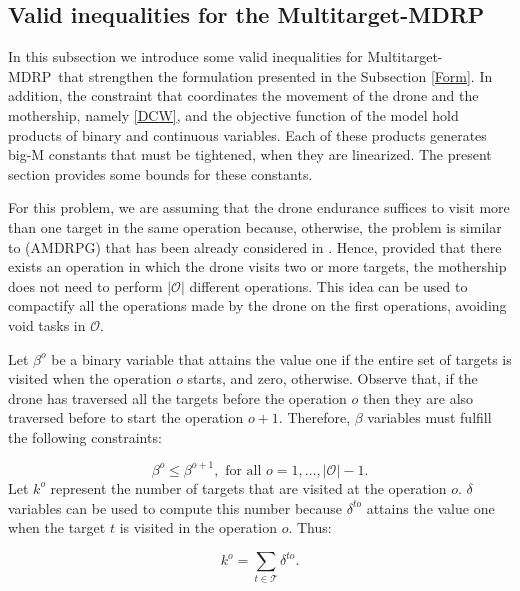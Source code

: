 \documentclass{itor}
\theoremstyle{definition}
\theoremstyle{remark}
\def\AMD{{\sf Multitarget-MDRP\xspace}}
\begin{document}



\subsection{Valid inequalities for the \AMD} 

In this subsection we introduce some valid inequalities for \AMD \ that strengthen the formulation presented in the Subsection \ref{Form}. In addition, the constraint that coordinates the movement of the drone and the mothership, namely \eqref{DCW}, and the objective function of the model hold products of binary and continuous variables. Each of these products generates big-M constants that must be tightened, when they are linearized. The present section provides some bounds for these constants.

For this problem, we are assuming that the drone  endurance suffices to visit more than one target in the same operation because, otherwise, the problem is similar to (AMDRPG) that has  been already considered in \cite{art:Amorosi2021}. Hence, provided that there exists an operation in which the drone visits two or more targets, the mothership does not need to perform $|\mathcal O|$ different operations. This idea can be used to compactify all the operations made by the drone on the first operations, avoiding void tasks in $\mathcal O$.
\noindent

Let $\beta^o$ be a binary variable that attains the value one if the entire set of targets is visited when the operation $o$ starts, and zero, otherwise. Observe that, if the drone has traversed all the targets before the operation $o$ then they are also traversed before to start the operation $o+1$. Therefore, $\beta$ variables must fulfill the following constraints:

\begin{equation}\tag{Monotonicity}\label{eq:Monotonicity}
\beta^{o} \leq \beta^{o+1}, \mbox{ for all } o=1,\ldots, |\mathcal{O}|-1.
\end{equation}
Let $k^o$ represent the number of targets that are visited at the operation $o$. $\delta$ variables can be used to compute this number because $\delta^{to}$ attains the value one when the target $t$ is visited in the operation $o$. Thus:

$$k^o=\sum_{t\in\mathcal T} \delta^{to}.$$
\end{document}

